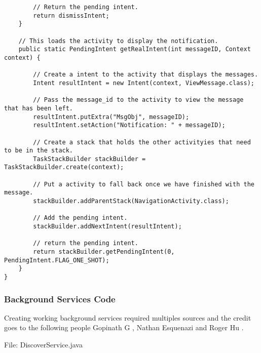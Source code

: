 \begin{lstlisting}
        // Return the pending intent.
        return dismissIntent;
    }

    // This loads the activity to display the notification.
    public static PendingIntent getRealIntent(int messageID, Context context) {

        // Create a intent to the activity that displays the messages.
        Intent resultIntent = new Intent(context, ViewMessage.class);

        // Pass the message_id to the activity to view the message that has been left.
        resultIntent.putExtra("MsgObj", messageID);
        resultIntent.setAction("Notification: " + messageID);

        // Create a stack that holds the other activityies that need to be in the stack.
        TaskStackBuilder stackBuilder = TaskStackBuilder.create(context);

        // Put a activity to fall back once we have finished with the message.
        stackBuilder.addParentStack(NavigationActivity.class);

        // Add the pending intent.
        stackBuilder.addNextIntent(resultIntent);

        // return the pending intent.
        return stackBuilder.getPendingIntent(0, PendingIntent.FLAG_ONE_SHOT);
    }
}

\end{lstlisting}

\subsubsection{Background Services Code}

Creating working background services required multiples sources and the credit goes to the following people Gopinath G \cite{GopinathG:AndroidRestFulServices:2014:online}, Nathan Esquenazi \cite{NathanEsquenazi:StartingBackgroundServices:2013:online} and Roger Hu \cite{RogerHu:StartingBackgroundServices:2015:online}.

File: DiscoverService.java


